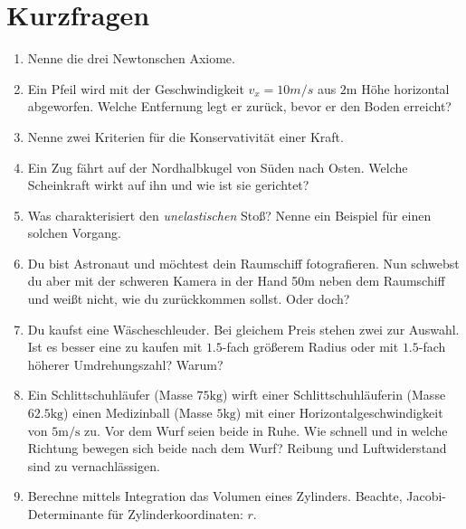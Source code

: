 \section{Kurzfragen}
\begin{enumerate}

  \item Nenne die drei Newtonschen Axiome.
  \item Ein Pfeil wird mit der Geschwindigkeit $v_x = 10 m/s$ aus $2\si{\meter}$ Höhe horizontal abgeworfen. Welche
        Entfernung legt er zurück, bevor er den Boden erreicht?
  \item Nenne zwei Kriterien für die Konservativität einer Kraft.
  \item Ein Zug fährt auf der Nordhalbkugel von Süden nach Osten. Welche Scheinkraft wirkt auf ihn und wie ist sie gerichtet?
  \item Was charakterisiert den \emph{unelastischen} Stoß? Nenne ein Beispiel für einen solchen Vorgang.
  \item Du bist Astronaut und möchtest dein Raumschiff fotografieren. Nun schwebst du aber mit der schweren Kamera in der Hand 50m
        neben dem Raumschiff und weißt nicht, wie du zurückkommen sollst. Oder doch?
  \item Du kaufst eine Wäscheschleuder. Bei gleichem Preis stehen zwei zur Auswahl.  Ist es besser eine zu kaufen mit $1.5$-fach
        größerem Radius oder mit $1.5$-fach höherer Umdrehungszahl? Warum?
  \item Ein Schlittschuhläufer (Masse $75\si{\kilo\gram}$) wirft einer Schlittschuhläuferin (Masse $62.5\si{\kilo\gram}$) einen
        Medizinball (Masse $5\si{\kilo\gram}$) mit einer Horizontalgeschwindigkeit von $5\si{\meter\per\second}$ zu. Vor dem Wurf
        seien beide in Ruhe. Wie schnell und in welche Richtung bewegen sich beide nach dem Wurf? Reibung und Luftwiderstand sind
        zu vernachlässigen.
  \item Berechne mittels Integration das Volumen eines Zylinders. Beachte, Jacobi-Determinante für Zylinderkoordinaten: $r$.
\end{enumerate}

\newpage
